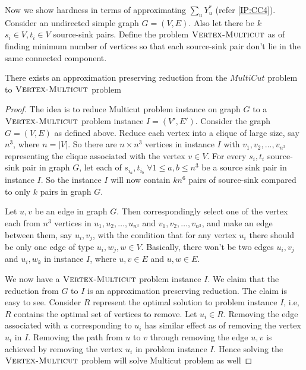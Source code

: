 Now we show hardness in terms of approximating $\sum_u Y_u^*$ (refer \ref{IP:CC4}). Consider an undirected simple graph $G=(V,E)$. Also let there be $k$ $s_i\in V,t_i\in V$ source-sink pairs. Define the problem $\textsc{Vertex-Multicut}$ as of finding minimum number of vertices so that each source-sink pair don't lie in the same connected component.
\begin{lemma}\label{bi-criterion-hardness-02}
There exists an approximation preserving reduction from the $MultiCut$ problem to $\textsc{Vertex-Multicut}$ problem
\end{lemma}
\begin{proof}

The idea is to reduce Multicut problem instance on graph $G$ to a $\textsc{Vertex-Multicut}$ problem instance $I=(V',E')$. Consider the graph $G=(V,E)$ as defined above. Reduce each vertex into a clique of large size, say $n^3$, where $n=|V|$. So there are $n\times n^3$ vertices in instance $I$ with $v_{1}, v_{2}, \dots, v_{n^3}$ representing the clique associated with the vertex $v \in V$. For every $s_i,t_i$ source-sink pair in graph $G$, let each of $s_{i_a}, t_{i_b} \; \forall 1\leq a,b \leq n^3 $ be a source sink pair in instance $I$. So the instance $I$ will now contain $kn^6$ pairs of source-sink compared to only $k$ pairs in graph $G$.

\noindent Let $u,v$ be an edge in graph $G$. Then correspondingly select one of the vertex each from $n^3$ vertices in $u_{1}, u_{2}, \dots, u_{n^3}$ and $v_{1}, v_{2}, \dots, v_{n^3}$, and make an edge between them, say $u_i,v_j$, with the condition that for any vertex $u_{i}$ there should be only one edge of type $u_i, w_j, w\in V$. Basically, there won't be two edges $u_i,v_j$ and $u_i,w_k$ in instance $I$, where $u,v \in E$ and $u,w \in E$.

\noindent We now have a $\textsc{Vertex-Multicut}$ problem instance $I$. We claim that the reduction from $G$ to $I$ is an approximation preserving reduction. The claim is easy to see. Consider $R$ represent the optimal solution to problem instance $I$, i.e, $R$ contains the optimal set of vertices to remove. Let $u_i\in R$. Removing the edge associated with $u$ corresponding to $u_i$ has similar effect as of removing the vertex $u_i$ in $I$. Removing the path from $u$ to $v$ through removing the edge $u,v$ is achieved by removing the vertex $u_i$ in problem instance $I$. Hence solving the $\textsc{Vertex-Multicut}$ problem will solve Multicut problem as well
\end{proof}

